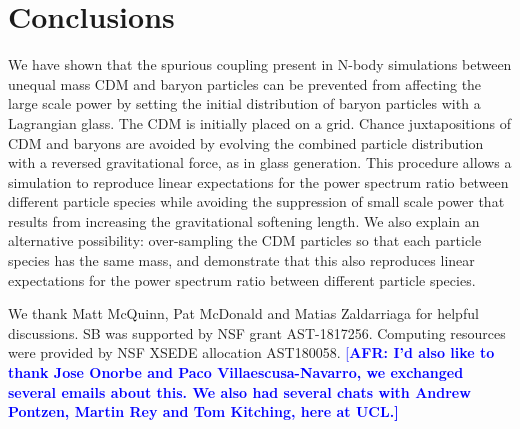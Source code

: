 \documentclass[a4paper,11pt]{article}
\newcommand{\AFR}[1]{\textcolor{blue}{[\bf AFR: #1]} }
\begin{document}
\section{Conclusions}

We have shown that the spurious coupling present in N-body simulations between unequal mass CDM and baryon particles can be prevented from affecting the large scale power by setting the initial distribution of baryon particles with a Lagrangian glass. The CDM is initially placed on a grid. Chance juxtapositions of CDM and baryons are avoided by evolving the combined particle distribution with a reversed gravitational force, as in glass generation. This procedure allows a simulation to reproduce linear expectations for the power spectrum ratio between different particle species while avoiding the suppression of small scale power that results from increasing the gravitational softening length. We also explain an alternative possibility: over-sampling the CDM particles so that each particle species has the same mass, and demonstrate that this also reproduces linear expectations for the power spectrum ratio between different particle species.

\acknowledgments

We thank Matt McQuinn, Pat McDonald and Matias Zaldarriaga for helpful discussions. SB was supported by NSF grant AST-1817256. Computing resources were provided by NSF XSEDE allocation AST180058.
\AFR{I'd also like to thank Jose Onorbe and Paco Villaescusa-Navarro, we exchanged several emails about this. We also had several chats with Andrew Pontzen, Martin Rey and Tom Kitching, here at UCL.}




\end{document}
